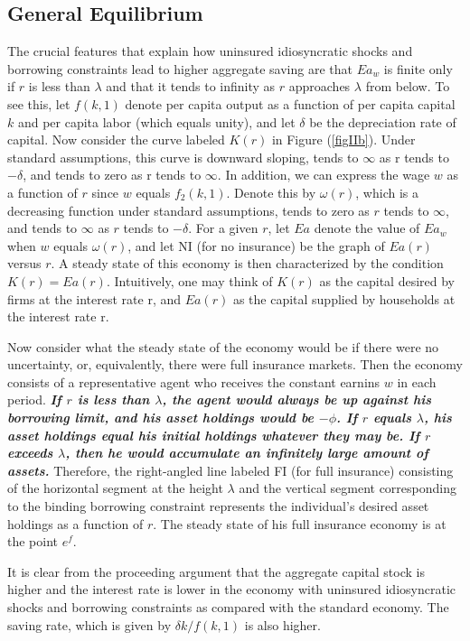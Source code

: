 \documentclass[12pt]{article}
\theoremstyle{definition}
\begin{document}
\subsection{General Equilibrium}

The crucial features that explain how uninsured idiosyncratic shocks and borrowing constraints lead to higher aggregate saving are that $Ea_w$ is finite only if $r$ is less than $\lambda$ and that it tends to infinity as $r$ approaches $\lambda$ from below. To see this, let $f(k, 1)$ denote per capita output as a function of per capita capital $k$ and per capita labor (which equals unity), and let $\delta$ be the depreciation rate of capital. Now consider the curve labeled $K(r)$ in Figure (\ref{figIIb}). Under standard assumptions, this curve is downward sloping, tends to $\infty$ as r tends to $-\delta$, and tends to zero as r tends to $\infty$. In addition, we can express the wage $w$ as a function of $r$ since $w$ equals $f_2(k, 1)$. Denote this by $\omega(r)$, which is a decreasing function under standard assumptions, tends to zero as $r$ tends to $\infty$, and tends to $\infty$ as $r$ tends to $-\delta$. For a given $r$, let $Ea$ denote the value of $Ea_w$ when $w$ equals $\omega(r)$, and let NI (for no insurance) be the graph of $Ea(r)$ versus $r$. A steady state of this economy is then characterized by the condition $K(r) = Ea(r)$. Intuitively, one may think of $K(r)$ as the capital desired by firms at the interest rate r, and $Ea(r)$ as the capital supplied by households at the interest rate r.

Now consider what the steady state of the economy would be if there were no uncertainty, or, equivalently, there were full insurance markets. Then the economy consists of a representative agent who receives the constant earnins $w$ in each period. \emph{\bf If $r$ is less than $\lambda$, the agent would always be up against his borrowing limit, and his asset holdings would be $-\phi$. If $r$ equals $\lambda$, his asset holdings equal his initial holdings whatever they may be. If $r$ exceeds $\lambda$, then he would accumulate an infinitely large amount of assets.} Therefore, the right-angled line labeled FI (for full insurance) consisting of the horizontal segment at the height $\lambda$ and the vertical segment corresponding to the binding borrowing constraint represents the individual's desired asset holdings as a function of $r$. The steady state of his full insurance economy is at the point $e^f$.

It is clear from the proceeding argument that the aggregate capital stock is higher and the interest rate is lower in the economy with uninsured idiosyncratic shocks and borrowing constraints as compared with the standard economy. The saving rate, which is given by $\delta k / f(k, 1)$ is also higher.
\end{document}
